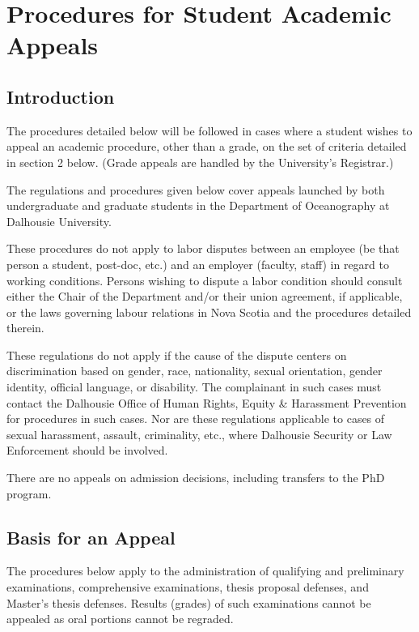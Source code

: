 \section{Procedures for Student Academic Appeals}

\subsection{Introduction}

\cp
\p The procedures detailed below will be followed in cases where a
student wishes to appeal an academic procedure, other than a grade, on the set
of criteria detailed in section 2 below. (Grade appeals are handled by the
University's Registrar.)

\p The regulations and procedures given below cover appeals launched by
both undergraduate and graduate students in the Department of Oceanography at
Dalhousie University.  

\p These procedures do not apply to labor disputes between an employee
(be that person a student, post-doc, etc.) and an employer (faculty, staff) in
regard to working conditions.  Persons wishing to dispute a labor condition
should consult either the Chair of the Department and/or their union agreement,
if applicable, or the laws governing labour relations in Nova Scotia and the
procedures detailed therein. 

\p These regulations do not apply if the cause of the dispute centers
on discrimination based on gender, race, nationality, sexual orientation,
gender identity, official language, or disability.  The complainant in such
cases must contact the Dalhousie Office of Human Rights, Equity \& Harassment
Prevention for procedures in such cases.  Nor are these regulations applicable
to cases of sexual harassment, assault, criminality, etc., where Dalhousie
Security or Law Enforcement should be involved.  

\p There are no appeals on admission decisions, including transfers to
the PhD program.  

\subsection{Basis for an Appeal}
\cp

\p The procedures below apply to the administration of qualifying and
preliminary examinations, comprehensive examinations, thesis proposal defenses,
and Master's thesis defenses.  Results (grades) of such examinations cannot be
appealed as oral portions cannot be regraded.  

